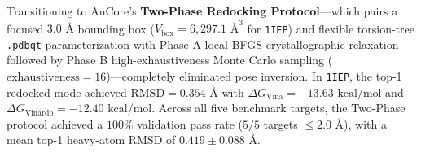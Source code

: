 \documentclass[11pt,a4paper]{article}
\begin{document}
Transitioning to AnCore's \textbf{Two-Phase Redocking Protocol}---which pairs a focused $3.0\text{ \AA}$ bounding box ($V_{\text{box}} = 6,297.1\text{ \AA}^3$ for \texttt{1IEP}) and flexible torsion-tree \texttt{.pdbqt} parameterization with Phase A local BFGS crystallographic relaxation followed by Phase B high-exhaustiveness Monte Carlo sampling ($\text{exhaustiveness} = 16$)---completely eliminated pose inversion. In \texttt{1IEP}, the top-1 redocked mode achieved $\text{RMSD} = 0.354\text{ \AA}$ with $\Delta G_{\text{Vina}} = -13.63\text{ kcal/mol}$ and $\Delta G_{\text{Vinardo}} = -12.40\text{ kcal/mol}$. Across all five benchmark targets, the Two-Phase protocol achieved a $100\%$ validation pass rate ($5/5$ targets $\le 2.0\text{ \AA}$), with a mean top-1 heavy-atom $\text{RMSD}$ of $0.419 \pm 0.088\text{ \AA}$.
\end{document}
